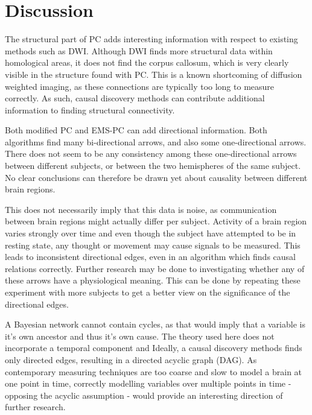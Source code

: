 \documentclass[a4paper, 10pt, english, onecolumn]{article}
\begin{document}
\section{Discussion}
The structural part of PC adds interesting information with respect to existing methods such as DWI.
Although DWI finds more structural data within homological areas, it does not find the corpus callosum, which is very clearly visible in the structure found with PC.
This is a known shortcoming of diffusion weighted imaging, as these connections are typically too long to measure correctly.
As such, causal discovery methods can contribute additional information to finding structural connectivity.

Both modified PC and EMS-PC can add directional information.
Both algorithms find many bi-directional arrows, and also some one-directional arrows.
There does not seem to be any consistency among these one-directional arrows  between different subjects, or between the two hemispheres of the same subject.
No clear conclusions can therefore be drawn yet about causality between different brain regions.

This does not necessarily imply that this data is noise, as communication between brain regions might actually differ per subject.
Activity of a brain region varies strongly over time and even though the subject have attempted to be in resting state, any thought or movement may cause signals to be measured.
This leads to inconsistent directional edges, even in an algorithm which finds causal relations correctly.
Further research may be done to investigating whether any of these arrows have a physiological meaning.
This can be done by repeating these experiment with more subjects to get a better view on the significance of the directional edges.

A Bayesian network cannot contain cycles, as that would imply that a variable is it's own ancestor and thus it's own cause.
The theory used here does not incorporate a temporal component and 
Ideally, a causal discovery methods finds only directed edges, resulting in a directed acyclic graph (DAG).
As contemporary measuring techniques are too coarse and slow to model a brain at one point in time, correctly modelling variables over multiple points in time - opposing the acyclic assumption - would provide an interesting direction of further research.
\end{document}
